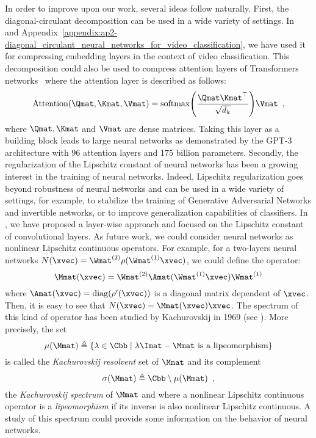 In order to improve upon our work, several ideas follow naturally.
First, the diagonal-circulant decomposition can be used in a wide variety of settings.
In~ and Appendix~\ref{appendix:ap2-diagonal_circulant_neural_networks_for_video_classification}, we have used it for compressing embedding layers in the context of video classification.
This decomposition could also be used to compress attention layers of Transformers networks~\cite{vaswani2017attention} where the attention layer is described as follows:
\begin{equation}
  \text{Attention}(\Qmat, \Kmat, \Vmat) = \text{softmax} \left( \frac{\Qmat \Kmat^\top}{\sqrt{d_k}} \right) \Vmat \enspace,
\end{equation}
where $\Qmat, \Kmat$ and $\Vmat$ are dense matrices.
Taking this layer as a building block leads to large neural networks as demonstrated by the GPT-3 architecture with 96 attention layers and 175 billion parameters.
Secondly, the regularization of the Lipschitz constant of neural networks has been a growing interest in the training of neural networks.
Indeed, Lipschitz regularization goes beyond robustness of neural networks and can be used in a wide variety of settings, for example, to stabilize the training of Generative Adversarial Networks and invertible networks, or to improve generalization capabilities of classifiers.
In , we have proposed a layer-wise approach and focused on the Lipschitz constant of convolutional layers.
As future work, we could consider neural networks as nonlinear Lipschitz continuous operators.
For example, for a two-layers neural networks $N(\xvec) = \Wmat^{(2)} \rho(\Wmat^{(1)} \xvec)$,
we could define the operator:
\begin{equation}
  \Mmat(\xvec) = \Wmat^{(2)} \Amat (\Wmat^{(1)} \xvec) \Wmat^{(1)}
\end{equation}
where $\Amat(\xvec) = \diag(\rho'(\xvec))$ is a diagonal matrix dependent of $\xvec$.
Then, it is easy to see that $N(\xvec) = \Mmat(\xvec) \xvec$.
The spectrum of this kind of operator has been studied by Kachurovskij in 1969 (see \citet{appell2008nonlinear}). 
More precisely, the set 
\begin{equation}
  \mu(\Mmat) \triangleq \left\{ \lambda \in \Cbb \mid \lambda \Imat - \Mmat \text{ is a lipeomorphism} \right\} 
\end{equation} 
is called the \emph{Kachurovskij resolvent} set of $\Mmat$ and its complement
\begin{equation}
  \sigma(\Mmat) \triangleq \Cbb \setminus \mu(\Mmat) \enspace, 
\end{equation}
the \emph{Kachurovskij spectrum} of $\Mmat$ and where a nonlinear Lipschitz continuous operator is a \emph{lipeomorphism} if its inverse is also nonlinear Lipschitz continuous.
A study of this spectrum could provide some information on the behavior of neural networks.


